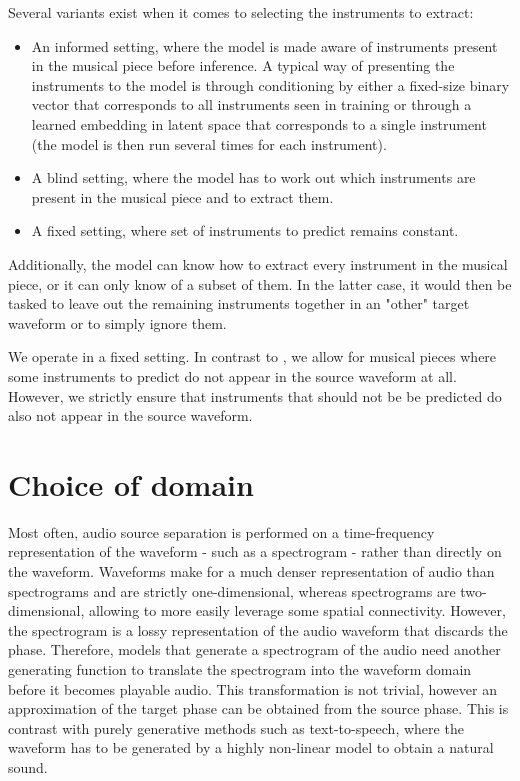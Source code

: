 \documentclass[twocolumn,superscriptaddress,aps]{revtex4-1}
\begin{document}
Several variants exist when it comes to selecting the instruments to extract:
\begin{itemize}
	\item An informed setting, where the model is made aware of instruments present in the musical piece before inference. A typical way of presenting the instruments to the model is through conditioning by either a fixed-size binary vector that corresponds to all instruments seen in training or through a learned embedding in latent space that corresponds to a single instrument (the model is then run several times for each instrument).
	\item A blind setting, where the model has to work out which instruments are present in the musical piece and to extract them.
	\item A fixed setting, where set of instruments to predict remains constant.
\end{itemize}
Additionally, the model can know how to extract every instrument in the musical piece, or it can only know of a subset of them. In the latter case, it would then be tasked to leave out the remaining instruments together in an "other" target waveform or to simply ignore them.

We operate in a fixed setting. In contrast to \cite{SourceSeparationWaveformDomain}, we allow for musical pieces where some instruments to predict do not appear in the source waveform at all. However, we strictly ensure that instruments that should not be be predicted do also not appear in the source waveform.

\section{Choice of domain}
Most often, audio source separation is performed on a time-frequency representation of the waveform - such as a spectrogram - rather than directly on the waveform. Waveforms make for a much denser representation of audio than spectrograms and are strictly one-dimensional, whereas spectrograms are two-dimensional, allowing to more easily leverage some spatial connectivity. However, the spectrogram is a lossy representation of the audio waveform that discards the phase. Therefore, models that generate a spectrogram of the audio need another generating function to translate the spectrogram into the waveform domain before it becomes playable audio. This transformation is not trivial, however an approximation of the target phase can be obtained from the source phase. This is contrast with purely generative methods such as text-to-speech, where the waveform has to be generated by a highly non-linear model to obtain a natural sound.
\end{document}
